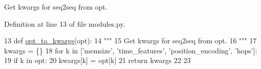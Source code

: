 \begin{DoxyVerb}Get kwargs for seq2seq from opt.
\end{DoxyVerb}
 

Definition at line 13 of file modules.\+py.


\begin{DoxyCode}
13 \textcolor{keyword}{def }\hyperlink{namespaceprojects_1_1controllable__dialogue_1_1controllable__seq2seq_1_1modules_a29bd74b29a327dc6c2d4a3aaa9ec3c08}{opt\_to\_kwargs}(opt):
14     \textcolor{stringliteral}{"""}
15 \textcolor{stringliteral}{    Get kwargs for seq2seq from opt.}
16 \textcolor{stringliteral}{    """}
17     kwargs = \{\}
18     \textcolor{keywordflow}{for} k \textcolor{keywordflow}{in} [\textcolor{stringliteral}{'memsize'}, \textcolor{stringliteral}{'time\_features'}, \textcolor{stringliteral}{'position\_encoding'}, \textcolor{stringliteral}{'hops'}]:
19         \textcolor{keywordflow}{if} k \textcolor{keywordflow}{in} opt:
20             kwargs[k] = opt[k]
21     \textcolor{keywordflow}{return} kwargs
22 
23 
\end{DoxyCode}
